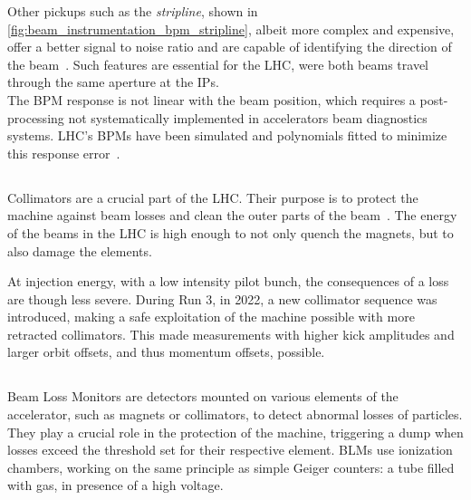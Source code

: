 Other pickups such as the \textit{stripline}, shown in
\cref{fig:beam_instrumentation_bpm_stripline}, albeit more complex and expensive, offer a better
signal to noise ratio and are capable of identifying the direction of the
beam~\cite{wendt_bpm_2020}. Such features are essential for the LHC, were both beams travel through
the same aperture at the IPs.\\ 
The BPM response is not linear with the beam position, which requires a post-processing not
systematically implemented in accelerators beam diagnostics systems. LHC's BPMs have been simulated
and polynomials fitted to minimize this response error~\cite{a_nosych_geometrical_2014}.


 
\subsection{}

Collimators are a crucial part of the LHC. Their purpose is to protect the machine against beam
losses and clean the outer parts of the beam~\cite{redaelli_lhc_2011}. The energy of the beams in
the LHC is high enough to not only quench the magnets, but to also damage the elements.

At injection energy, with a low intensity pilot bunch, the consequences of a loss are though less
severe. During Run 3, in 2022, a new collimator sequence was introduced, making a safe exploitation
of the machine possible with more retracted collimators. This made measurements with higher kick
amplitudes and larger orbit offsets, and thus momentum offsets, possible.


\subsection{}

Beam Loss Monitors are detectors mounted on various elements of the accelerator, such as magnets or
collimators, to detect abnormal losses of particles. They play a crucial role in the protection of
the machine, triggering a dump when losses exceed the threshold set for their respective element. 
BLMs use ionization chambers, working on the same principle as simple Geiger counters: a tube filled
with gas, in presence of a high voltage.

